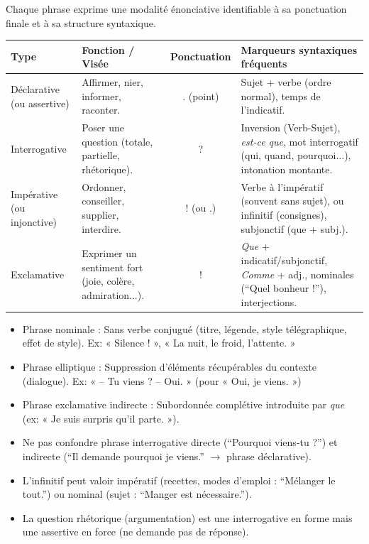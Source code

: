 \documentclass[11pt]{article}
\newcommand{\cle}[1]{{\popxbold\color{popdark}#1}}
\begin{document}
\begin{definition}
Chaque phrase exprime une \cle{modalité énonciative} identifiable à sa ponctuation finale et à sa structure syntaxique.
\begin{center}
\begin{tabularx}{\linewidth}{|l|X|c|X|}\hline
\textbf{Type} & \textbf{Fonction / Visée} & \textbf{Ponctuation} & \textbf{Marqueurs syntaxiques fréquents} \\ \hline
\cle{Déclarative} (ou assertive) & Affirmer, nier, informer, raconter. & . (point) & Sujet + verbe (ordre normal), temps de l'indicatif. \\ \hline
\cle{Interrogative} & Poser une question (totale, partielle, rhétorique). & ? & Inversion (Verb-Sujet), \emph{est-ce que}, mot interrogatif (qui, quand, pourquoi...), intonation montante. \\ \hline
\cle{Impérative} (ou injonctive) & Ordonner, conseiller, supplier, interdire. & ! (ou .) & Verbe à l'impératif (souvent sans sujet), ou infinitif (consignes), subjonctif (que + subj.). \\ \hline
\cle{Exclamative} & Exprimer un sentiment fort (joie, colère, admiration...). & ! & \emph{Que} + indicatif/subjonctif, \emph{Comme} + adj., nominales (``Quel bonheur !''), interjections. \\ \hline
\end{tabularx}
\end{center}
\end{definition}

\begin{definition}
\begin{itemize}
    \item \cle{Phrase nominale} : Sans verbe conjugué (titre, légende, style télégraphique, effet de style). Ex: « Silence ! », « La nuit, le froid, l'attente. »
    \item \cle{Phrase elliptique} : Suppression d'éléments récupérables du contexte (dialogue). Ex: « -- Tu viens ? -- Oui. » (pour « Oui, je viens. »)
    \item \cle{Phrase exclamative indirecte} : Subordonnée complétive introduite par \emph{que} (ex: « Je suis surpris qu'il parte. »).
\end{itemize}
\end{definition}

\begin{attention}
\begin{itemize}
    \item Ne pas confondre \cle{phrase interrogative directe} (``Pourquoi viens-tu ?'') et \cle{indirecte} (``Il demande pourquoi je viens.'' $\rightarrow$ phrase déclarative).
    \item L'\cle{infinitif} peut valoir impératif (recettes, modes d'emploi : ``Mélanger le tout.'') ou nominal (sujet : ``Manger est nécessaire.'').
    \item La \cle{question rhétorique} (argumentation) est une interrogative en forme mais une assertive en force (ne demande pas de réponse).
\end{itemize}
\end{attention}
\end{document}
